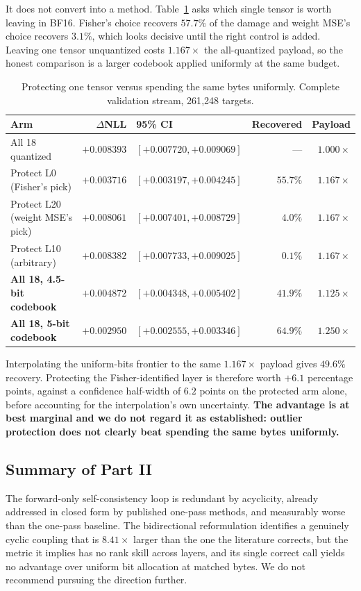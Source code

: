 It does not convert into a method. Table~\ref{tab:protect} asks which single
tensor is worth leaving in BF16. Fisher's choice recovers $57.7\%$ of the damage
and weight MSE's choice recovers $3.1\%$, which looks decisive until the right
control is added. Leaving one tensor unquantized costs $1.167\times$ the
all-quantized payload, so the honest comparison is a larger codebook applied
uniformly at the same budget.

\begin{table}[ht]
\centering\small
\caption{Protecting one tensor versus spending the same bytes uniformly.
Complete validation stream, 261{,}248 targets.}
\label{tab:protect}
\begin{tabular}{lrlrr}\toprule
Arm & $\Delta$NLL & 95\% CI & Recovered & Payload\\\midrule
All 18 quantized & $+0.008393$ & $[+0.007720,+0.009069]$ & --- & $1.000\times$\\
Protect L0 (Fisher's pick) & $+0.003716$ & $[+0.003197,+0.004245]$ & $55.7\%$ & $1.167\times$\\
Protect L20 (weight MSE's pick) & $+0.008061$ & $[+0.007401,+0.008729]$ & $4.0\%$ & $1.167\times$\\
Protect L10 (arbitrary) & $+0.008382$ & $[+0.007733,+0.009025]$ & $0.1\%$ & $1.167\times$\\
\textbf{All 18, 4.5-bit codebook} & $+0.004872$ & $[+0.004348,+0.005402]$ & $41.9\%$ & $1.125\times$\\
\textbf{All 18, 5-bit codebook} & $\mathbf{+0.002950}$ & $[+0.002555,+0.003346]$ & $\mathbf{64.9\%}$ & $1.250\times$\\\bottomrule
\end{tabular}
\end{table}

Interpolating the uniform-bits frontier to the same $1.167\times$ payload gives
$49.6\%$ recovery. Protecting the Fisher-identified layer is therefore worth
$+6.1$ percentage points, against a confidence half-width of $6.2$ points on the
protected arm alone, before accounting for the interpolation's own uncertainty.
\textbf{The advantage is at best marginal and we do not regard it as
established: outlier protection does not clearly beat spending the same bytes
uniformly.}

\subsection{Summary of Part II}

The forward-only self-consistency loop is redundant by acyclicity, already
addressed in closed form by published one-pass methods, and measurably worse
than the one-pass baseline. The bidirectional reformulation identifies a
genuinely cyclic coupling that is $8.41\times$ larger than the one the
literature corrects, but the metric it implies has no rank skill across layers,
and its single correct call yields no advantage over uniform bit allocation at
matched bytes. We do not recommend pursuing the direction further.
